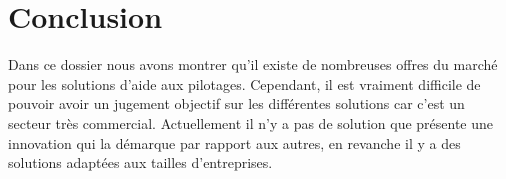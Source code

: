 \section{Conclusion}

Dans ce dossier nous avons montrer qu'il existe de nombreuses offres du marché pour les solutions d'aide aux pilotages. Cependant, il est vraiment difficile de pouvoir avoir un jugement objectif sur les différentes solutions car c'est un secteur très commercial. Actuellement il n'y a pas de solution que présente une innovation qui la démarque par rapport aux autres, en revanche il y a des solutions adaptées aux tailles d'entreprises.  